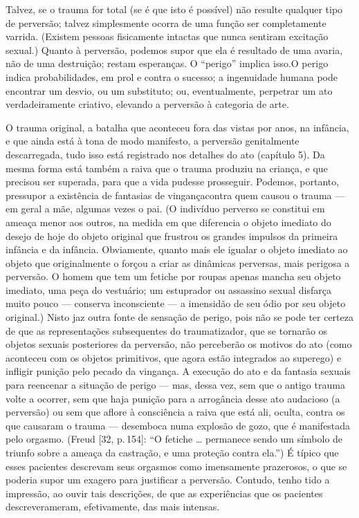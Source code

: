 Talvez, se o trauma for total (se é que isto é possível) não resulte
qualquer tipo de perversão; talvez simplesmente ocorra de uma função
ser completamente varrida. (Existem pessoas fisicamente intactas que
nunca sentiram excitação sexual.) Quanto à perversão, podemos supor que
ela é resultado de uma avaria, não de uma destruição; restam
esperanças. O ``perigo'' implica isso.\idxinfanperig[|)] O
perigo indica probabilidades, em prol e contra o sucesso; a ingenuidade
humana pode encontrar um desvio, ou um substituto; ou, eventualmente,
perpetrar um ato verdadeiramente criativo,\idxcria{} elevando a perversão à
categoria de arte.

O trauma original, a batalha que aconteceu fora das vistas por anos,
na infância, e que ainda está à tona de modo manifesto, a perversão
genitalmente descarregada, tudo isso está registrado nos detalhes do
ato (capítulo 5). Da mesma forma está também a raiva que o trauma
produziu na criança, e que precisou ser superada, para que a vida
pudesse prosseguir. Podemos, portanto, pressupor a existência de
fantasias de vingança\idxvinga[|(] contra quem causou o trauma --- em geral a mãe,
algumas vezes o pai. (O indivíduo perverso se constitui em ameaça menor
aos outros, na medida em que diferencia o objeto imediato do desejo de
hoje do objeto original que frustrou os grandes impulsos da
primeira infância e da infância. Obviamente, quanto mais ele igualar o
objeto imediato ao objeto que originalmente o forçou a criar as
dinâmicas perversas, mais perigosa a perversão. O homem que tem um
fetiche\idxfetic{} por roupas apenas mancha seu objeto imediato, uma peça do
vestuário; um estuprador\idxestup{} ou assassino\idxassas{} sexual disfarça muito pouco ---
conserva inconsciente --- a imensidão de seu ódio por seu objeto
original.) Nisto jaz outra fonte de sensação de perigo, pois não se
pode ter certeza de que as representações subsequentes do
traumatizador, que se tornarão os objetos sexuais posteriores da
perversão, não perceberão os motivos do ato (como aconteceu com os
objetos primitivos, que agora estão integrados ao superego) e infligir
punição pelo pecado da vingança. A execução do ato e da fantasia
sexuais para reencenar a situação de perigo --- mas, dessa vez, sem
que o antigo trauma volte a ocorrer, sem que haja punição para a
arrogância desse ato audacioso (a perversão) ou sem que aflore à
consciência a raiva que está ali, oculta, contra os que causaram o
trauma --- desemboca numa explosão de gozo,\idxorgasfet{} que é manifestada pelo\idxfeticorga{}
orgasmo. (Freud [32, p.\,154]: ``O fetiche \ldots{} permanece
sendo um símbolo de triunfo sobre a ameaça da castração,\idxcasta{} e uma proteção
contra ela.'')\idxfreudfetic{} É típico que esses pacientes descrevam seus
orgasmos como imensamente prazerosos, o que se poderia supor um exagero
para justificar a perversão. Contudo, tenho tido a impressão, ao ouvir
tais descrições, de que as experiências que os pacientes descreveram\idxtrauma[|)]
eram, efetivamente, das mais intensas.

